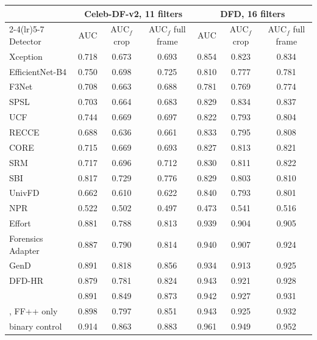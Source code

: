 \begin{tabular}{@{}l ccc ccc@{}}
\toprule
 & \multicolumn{3}{c}{Celeb-DF-v2, 11 filters} & \multicolumn{3}{c}{DFD, 16 filters} \\
\cmidrule(lr){2-4}\cmidrule(lr){5-7}
Detector & AUC & AUC$_f$ crop & AUC$_f$ full frame & AUC & AUC$_f$ crop & AUC$_f$ full frame \\
\midrule
Xception & 0.718 & 0.673 & 0.693 & 0.854 & 0.823 & 0.834 \\
EfficientNet-B4 & 0.750 & 0.698 & 0.725 & 0.810 & 0.777 & 0.781 \\
F3Net & 0.708 & 0.663 & 0.688 & 0.781 & 0.769 & 0.774 \\
SPSL & 0.703 & 0.664 & 0.683 & 0.829 & 0.834 & 0.837 \\
UCF & 0.744 & 0.669 & 0.697 & 0.822 & 0.793 & 0.804 \\
RECCE & 0.688 & 0.636 & 0.661 & 0.833 & 0.795 & 0.808 \\
CORE & 0.715 & 0.669 & 0.693 & 0.827 & 0.813 & 0.821 \\
SRM & 0.717 & 0.696 & 0.712 & 0.830 & 0.811 & 0.822 \\
SBI~\cite{sbi} & 0.817 & 0.729 & 0.776 & 0.829 & 0.803 & 0.810 \\
UnivFD & 0.662 & 0.610 & 0.622 & 0.840 & 0.793 & 0.801 \\
NPR & 0.522 & 0.502 & 0.497 & 0.473 & 0.541 & 0.516 \\
Effort~\cite{effort} & 0.881 & 0.788 & 0.813 & 0.939 & 0.904 & 0.905 \\
Forensics Adapter~\cite{forensicsadapter} & 0.887 & 0.790 & 0.814 & 0.940 & 0.907 & 0.924 \\
GenD~\cite{gend2026} & 0.891 & 0.818 & 0.856 & 0.934 & 0.913 & 0.925 \\
DFD-HR~\cite{dfdhr2026} & 0.879 & 0.781 & 0.824 & 0.943 & 0.921 & 0.928 \\
\ours{} & 0.891 & 0.849 & 0.873 & 0.942 & 0.927 & 0.931 \\
\ours{}, FF++ only & 0.898 & 0.797 & 0.851 & 0.943 & 0.925 & 0.932 \\
binary control & 0.914 & 0.863 & 0.883 & 0.961 & 0.949 & 0.952 \\
\bottomrule
\end{tabular}

